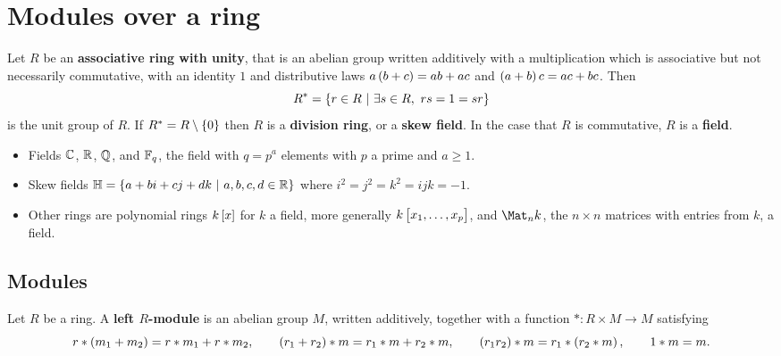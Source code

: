 \def\module{M4P63 Algebra IV}
\def\lecturer{Dr John Britnell}
\def\term{Spring 2020}
\def\cover{}
\def\syllabus{}
\def\thm{section}







\setcounter{section}{0}

\section{Modules over a ring}


Let $ R $ be an \textbf{associative ring with unity}, that is an abelian group written additively with a multiplication which is associative but not necessarily commutative, with an identity $ 1 $ and distributive laws $ a\br{b + c} = ab + ac $ and $ \br{a + b}c = ac + bc $. Then
$$ R^* = \cbr{r \in R \st \exists s \in R, \ rs = 1 = sr} $$
is the unit group of $ R $. If $ R^* = R \setminus \cbr{0} $ then $ R $ is a \textbf{division ring}, or a \textbf{skew field}. In the case that $ R $ is commutative, $ R $ is a \textbf{field}.

\begin{example*}
\hfill
\begin{itemize}
\item Fields $ \mathbb{C} $, $ \mathbb{R} $, $ \mathbb{Q} $, and $ \mathbb{F}_q $, the field with $ q = p^a $ elements with $ p $ a prime and $ a \ge 1 $.
\item Skew fields $ \HH = \cbr{a + bi + cj + dk \st a, b, c, d \in \RR} $ where $ i^2 = j^2 = k^2 = ijk = -1 $.
\item Other rings are polynomial rings $ k\sbr{x} $ for $ k $ a field, more generally $ k\sbr{x_1, \dots, x_p} $, and $ \Mat_n k $, the $ n \times n $ matrices with entries from $ k $, a field.
\end{itemize}
\end{example*}

\subsection{Modules}

\begin{definition}
Let $ R $ be a ring. A \textbf{left $ R $-module} is an abelian group $ M $, written additively, together with a function $ * : R \times M \to M $ satisfying
$$ r * \br{m_1 + m_2} = r * m_1 + r * m_2, \qquad \br{r_1 + r_2} * m = r_1 * m + r_2 * m, \qquad \br{r_1r_2} * m = r_1 * \br{r_2 * m}, \qquad 1 * m = m. $$
\end{definition}


